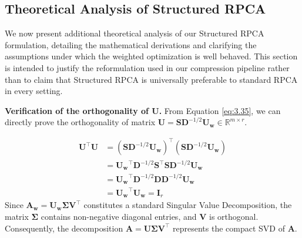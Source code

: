 
\subsection{Theoretical Analysis of Structured RPCA}
\label{subsec:theory}
We now present additional theoretical analysis of our Structured RPCA formulation, detailing the mathematical derivations and clarifying the assumptions under which the weighted optimization is well behaved. This section is intended to justify the reformulation used in our compression pipeline rather than to claim that Structured RPCA is universally preferable to standard RPCA in every setting.

\noindent\textbf{Verification of the orthogonality of U.}
From Equation \ref{eq:3.35}, we can directly prove the orthogonality of matrix $\mathbf{U} = \mathbf{S} \mathbf{D}^{-1/2} \mathbf{U_w} \in \mathbb{R}^{m \times r}$.

\begin{equation}
    \begin{aligned}
    \mathbf{U}^\top \mathbf{U} &= (\mathbf{S} \mathbf{D}^{-1/2} \mathbf{U_w})^\top (\mathbf{S} \mathbf{D}^{-1/2} \mathbf{U_w}) \\
    &= \mathbf{U_w}^\top \mathbf{D}^{-1/2} \mathbf{S}^\top \mathbf{S} \mathbf{D}^{-1/2} \mathbf{U_w} \\
    &= \mathbf{U_w}^\top \mathbf{D}^{-1/2} \mathbf{D} \mathbf{D}^{-1/2} \mathbf{U_w} \\
    &= \mathbf{U_w}^\top \mathbf{U_w} = \mathbf{I}_r
\end{aligned}
\end{equation}
Since $\mathbf{A_w} = \mathbf{U_w} \mathbf{\Sigma} \mathbf{V}^\top$ constitutes a standard Singular Value Decomposition, the matrix $\mathbf{\Sigma}$ contains non-negative diagonal entries, and $\mathbf{V}$ is orthogonal. Consequently, the decomposition $\mathbf{A} = \mathbf{U} \mathbf{\Sigma} \mathbf{V}^\top$ represents the compact SVD of $\mathbf{A}$.

